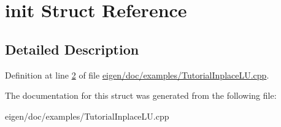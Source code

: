 \hypertarget{structinit}{}\section{init Struct Reference}
\label{structinit}


\subsection{Detailed Description}


Definition at line \hyperlink{eigen_2doc_2examples_2_tutorial_inplace_l_u_8cpp_source_l00002}{2} of file \hyperlink{eigen_2doc_2examples_2_tutorial_inplace_l_u_8cpp_source}{eigen/doc/examples/\+Tutorial\+Inplace\+L\+U.\+cpp}.



The documentation for this struct was generated from the following file\+:\begin{DoxyCompactItemize}
\item 
eigen/doc/examples/\+Tutorial\+Inplace\+L\+U.\+cpp\end{DoxyCompactItemize}
